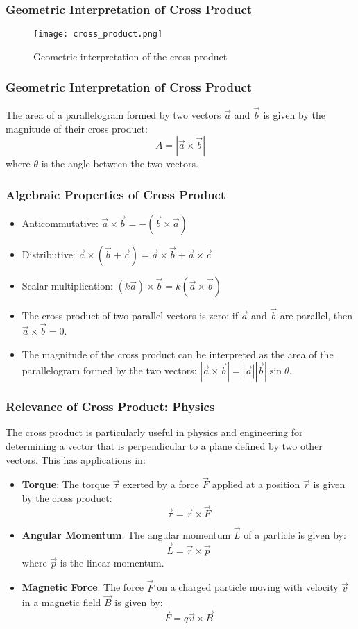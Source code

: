 \begin{frame}
\frametitle{Geometric Interpretation of Cross Product}
\begin{figure}
    \centering
    \texttt{[image: cross\_product.png]}
    \caption{Geometric interpretation of the cross product}
\end{figure}
\end{frame} 

\begin{frame}
    \frametitle{Geometric Interpretation of Cross Product}
    The area of a parallelogram formed by two vectors \(\vec{a}\) and \(\vec{b}\) is given by the magnitude of their cross product:
    \[
    A = |\vec{a} \times \vec{b}|
    \]
    where \(\theta\) is the angle between the two vectors.

\end{frame}

\begin{frame}
    \frametitle{Algebraic Properties of Cross Product}
    \begin{itemize}
        \item Anticommutative: \(\vec{a} \times \vec{b} = -(\vec{b} \times \vec{a})\)
        \item Distributive: \(\vec{a} \times (\vec{b} + \vec{c}) = \vec{a} \times \vec{b} + \vec{a} \times \vec{c}\)
        \item Scalar multiplication: \((k \vec{a}) \times \vec{b} = k (\vec{a} \times \vec{b})\)
        \item The cross product of two parallel vectors is zero: if \(\vec{a}\) and \(\vec{b}\) are parallel, then \(\vec{a} \times \vec{b} = 0\).
        \item The magnitude of the cross product can be interpreted as the area of the parallelogram formed by the two vectors: \(|\vec{a} \times \vec{b}| = |\vec{a}| |\vec{b}| \sin \theta\).
    \end{itemize}
\end{frame}

\begin{frame}
    \frametitle{Relevance of Cross Product: Physics}
    The cross product is particularly useful in physics and engineering for determining a vector that is perpendicular to a plane defined by two other vectors. This has applications in:
    \begin{itemize}
        \item \textbf{Torque}: The torque \(\vec{\tau}\) exerted by a force \(\vec{F}\) applied at a position \(\vec{r}\) is given by the cross product:
        \[
        \vec{\tau} = \vec{r} \times \vec{F}
        \]
        \item \textbf{Angular Momentum}: The angular momentum \(\vec{L}\) of a particle is given by:
        \[
        \vec{L} = \vec{r} \times \vec{p}
        \]
        where \(\vec{p}\) is the linear momentum.
        \item \textbf{Magnetic Force}: The force \(\vec{F}\) on a charged particle moving with velocity \(\vec{v}\) in a magnetic field \(\vec{B}\) is given by:
        \[
        \vec{F} = q \vec{v} \times \vec{B}
        \]
    \end{itemize}
\end{frame}

